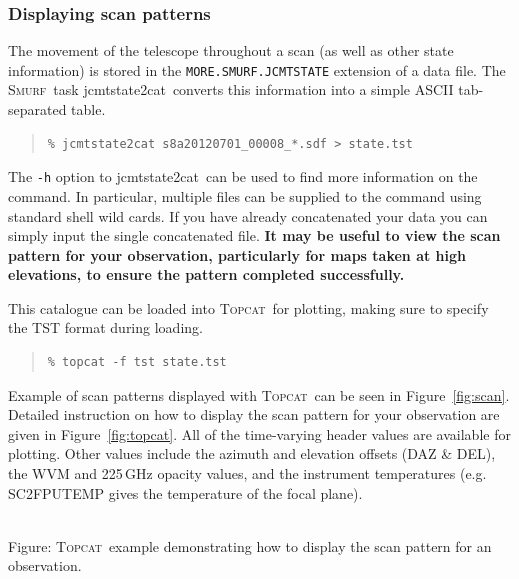 \documentclass[twoside,11pt]{article}
\newcommand{\htmladdnormallink}[2]{#1}
\newcommand{\htmladdimg}[1]{}
\newcommand{\xref}[3]{#1}
\newcommand{\xlabel}[1]{}
\renewcommand{\_}{\texttt{\symbol{95}}}
\newenvironment{myquote}{\begin{quote}\begin{small}}{\end{small}\end{quote}}
\newcommand{\smurf}{\xref{\textsc{Smurf}}{sun258}{}}
\newcommand{\topcat}{\htmladdnormallink{\textsc{Topcat}}{http://www.starlink.ac.uk/topcat}}
\newcommand{\task}[1]{\textsf{#1}}
\newcommand{\jcmtstate}{\xref{\task{jcmtstate2cat}}{sun258}{JCMTSTATE2CAT}}
\begin{document}
\subsubsection{\xlabel{scan_pat}Displaying scan patterns}
\label{sec:scan}

The movement of the telescope throughout a scan (as well as other
state information) is stored in the \texttt{MORE.SMURF.JCMTSTATE}
extension of a data file. The \smurf\ task \jcmtstate\ converts this
information into a simple ASCII tab-separated table.

\begin{myquote}
\begin{verbatim}
% jcmtstate2cat s8a20120701_00008_*.sdf > state.tst
\end{verbatim}
\end{myquote}

The \texttt{-h} option to \jcmtstate\ can be used to find more information on
the command. In particular, multiple files can be supplied to the
command using standard shell wild cards. If you have already
concatenated your data you can simply input the single concatenated
file. \textbf{It may be useful to view the scan pattern for your
observation, particularly for maps taken at high elevations, to ensure
the pattern completed successfully.}


This catalogue can be loaded into \topcat\ for plotting, making sure
to specify the TST format during loading.

\begin{myquote}
\begin{verbatim}
% topcat -f tst state.tst
\end{verbatim}
\end{myquote}

Example of scan patterns displayed with \topcat\ can be seen in
Figure~\ref{fig:scan}. Detailed instruction on how to display the scan
pattern for your observation are given in Figure~\ref{fig:topcat}. All
of the time-varying header values are available for plotting.  Other
values include the azimuth and elevation offsets (DAZ \& DEL), the WVM
and 225\,GHz opacity values, and the instrument temperatures (e.g.
SC2\_FPUTEMP gives the temperature of the focal plane).

\begin{htmlonly}
 \label{fig:topcat} \htmladdimg{sc21_topcat_example.png}
 \\
 Figure: \topcat\ example demonstrating how to display the scan
 pattern for an observation.\\ \\
\end{htmlonly}
\end{document}
